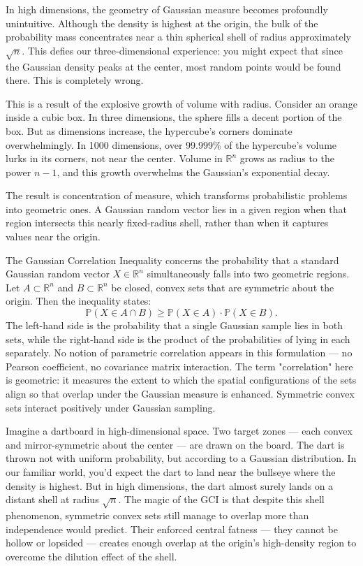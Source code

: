 In high dimensions, the geometry of Gaussian measure becomes profoundly unintuitive. Although the density is highest at the origin, the bulk of the probability mass concentrates near a thin spherical shell of radius approximately \( \sqrt{n} \). This defies our three-dimensional experience: you might expect that since the Gaussian density peaks at the center, most random points would be found there. This is completely wrong.

This is a result of the explosive growth of volume with radius. Consider an orange inside a cubic box. In three dimensions, the sphere fills a decent portion of the box. But as dimensions increase, the hypercube's corners dominate overwhelmingly. In 1000 dimensions, over 99.999\% of the hypercube's volume lurks in its corners, not near the center. Volume in \( \mathbb{R}^n \) grows as radius to the power \( n-1 \), and this growth overwhelms the Gaussian's exponential decay.

The result is concentration of measure, which transforms probabilistic problems into geometric ones. A Gaussian random vector lies in a given region when that region intersects this nearly fixed-radius shell, rather than when it captures values near the origin.

The Gaussian Correlation Inequality concerns the probability that a standard Gaussian random vector \( X \in \mathbb{R}^n \) simultaneously falls into two geometric regions. Let \( A \subset \mathbb{R}^n \) and \( B \subset \mathbb{R}^n \) be closed, convex sets that are symmetric about the origin. Then the inequality states:
\[
\mathbb{P}(X \in A \cap B) \geq \mathbb{P}(X \in A) \cdot \mathbb{P}(X \in B).
\]
The left-hand side is the probability that a single Gaussian sample lies in both sets, while the right-hand side is the product of the probabilities of lying in each separately. No notion of parametric correlation appears in this formulation — no Pearson coefficient, no covariance matrix interaction. The term "correlation" here is geometric: it measures the extent to which the spatial configurations of the sets align so that overlap under the Gaussian measure is enhanced. Symmetric convex sets interact positively under Gaussian sampling.

Imagine a dartboard in high-dimensional space. Two target zones — each convex and mirror-symmetric about the center — are drawn on the board. The dart is thrown not with uniform probability, but according to a Gaussian distribution. In our familiar world, you'd expect the dart to land near the bullseye where the density is highest. But in high dimensions, the dart almost surely lands on a distant shell at radius \( \sqrt{n} \). The magic of the GCI is that despite this shell phenomenon, symmetric convex sets still manage to overlap more than independence would predict. Their enforced central fatness — they cannot be hollow or lopsided — creates enough overlap at the origin's high-density region to overcome the dilution effect of the shell.


